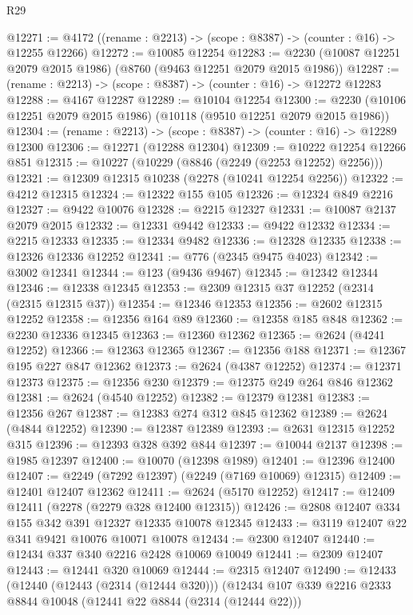 \begin{lexlean}{R29}
\begin{coremodule}
@12271 := @4172 ((rename : @2213) -> (scope : @8387) -> (counter : @16) -> @12255 @12266)
@12272 := @10085 @12254
@12283 := @2230 (@10087 @12251 @2079 @2015 @1986) (@8760 (@9463 @12251 @2079 @2015 @1986))
@12287 := (rename : @2213) -> (scope : @8387) -> (counter : @16) -> @12272 @12283
@12288 := @4167 @12287
@12289 := @10104 @12254
@12300 := @2230 (@10106 @12251 @2079 @2015 @1986) (@10118 (@9510 @12251 @2079 @2015 @1986))
@12304 := (rename : @2213) -> (scope : @8387) -> (counter : @16) -> @12289 @12300
@12306 := @12271 (@12288 @12304)
@12309 := @10222 @12254 @12266 @851
@12315 := @10227 (@10229 (@8846 (@2249 (@2253 @12252) @2256)))
@12321 := @12309 @12315 @10238 (@2278 (@10241 @12254 @2256))
@12322 := @4212 @12315
@12324 := @12322 @155 @105
@12326 := @12324 @849 @2216
@12327 := @9422 @10076
@12328 := @2215 @12327
@12331 := @10087 @2137 @2079 @2015
@12332 := @12331 @9442
@12333 := @9422 @12332
@12334 := @2215 @12333
@12335 := @12334 @9482
@12336 := @12328 @12335
@12338 := @12326 @12336 @12252
@12341 := @776 (@2345 @9475 @4023)
@12342 := @3002 @12341
@12344 := @123 (@9436 @9467)
@12345 := @12342 @12344
@12346 := @12338 @12345
@12353 := @2309 @12315 @37 @12252 (@2314 (@2315 @12315 @37))
@12354 := @12346 @12353
@12356 := @2602 @12315 @12252
@12358 := @12356 @164 @89
@12360 := @12358 @185 @848
@12362 := @2230 @12336 @12345
@12363 := @12360 @12362
@12365 := @2624 (@4241 @12252)
@12366 := @12363 @12365
@12367 := @12356 @188
@12371 := @12367 @195 @227 @847 @12362
@12373 := @2624 (@4387 @12252)
@12374 := @12371 @12373
@12375 := @12356 @230
@12379 := @12375 @249 @264 @846 @12362
@12381 := @2624 (@4540 @12252)
@12382 := @12379 @12381
@12383 := @12356 @267
@12387 := @12383 @274 @312 @845 @12362
@12389 := @2624 (@4844 @12252)
@12390 := @12387 @12389
@12393 := @2631 @12315 @12252 @315
@12396 := @12393 @328 @392 @844
@12397 := @10044 @2137
@12398 := @1985 @12397
@12400 := @10070 (@12398 @1989)
@12401 := @12396 @12400
@12407 := @2249 (@7292 @12397) (@2249 (@7169 @10069) @12315)
@12409 := @12401 @12407 @12362
@12411 := @2624 (@5170 @12252)
@12417 := @12409 @12411 (@2278 (@2279 @328 @12400 @12315))
@12426 := @2808 @12407 @334 @155 @342 @391 @12327 @12335 @10078 @12345
@12433 := @3119 @12407 @22 @341 @9421 @10076 @10071 @10078
@12434 := @2300 @12407
@12440 := @12434 @337 @340 @2216 @2428 @10069 @10049
@12441 := @2309 @12407
@12443 := @12441 @320 @10069
@12444 := @2315 @12407
@12490 := @12433
    (@12440
      (@12443 (@2314 (@12444 @320)))
      (@12434
        @107
        @339
        @2216
        @2333
        @8844
        @10048
        (@12441 @22 @8844 (@2314 (@12444 @22)))

\end{coremodule}
\end{lexlean}
